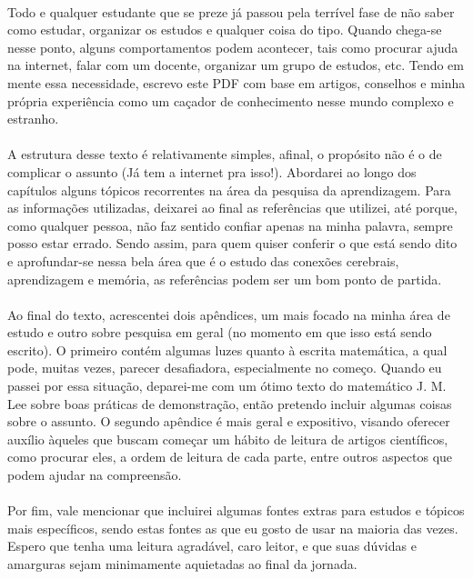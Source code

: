 \documentclass{article}
\begin{document}
\paragraph{} Todo e qualquer estudante que se preze já passou pela terrível fase de não saber como estudar,
organizar os estudos e qualquer coisa do tipo. Quando chega-se nesse ponto, alguns comportamentos podem acontecer, 
tais como procurar ajuda na internet, falar com um docente, organizar um grupo de estudos, etc. Tendo em mente 
essa necessidade, escrevo este PDF com base em artigos, conselhos e minha própria experiência como um caçador de conhecimento nesse
mundo complexo e estranho.

\paragraph{} A estrutura desse texto é relativamente simples, afinal, o propósito não é o de complicar o assunto (Já tem a internet pra isso!). Abordarei
ao longo dos capítulos alguns tópicos recorrentes na área da pesquisa da aprendizagem. Para as informações utilizadas, deixarei ao final as referências
que utilizei, até porque, como qualquer pessoa, não faz sentido confiar apenas na minha palavra, sempre posso estar errado. Sendo assim, para quem quiser 
conferir o que está sendo dito e aprofundar-se nessa bela área que é o estudo das conexões cerebrais, aprendizagem e memória, as referências podem ser 
um bom ponto de partida.

\paragraph{} Ao final do texto, acrescentei dois apêndices, um mais focado na minha área de estudo e outro sobre pesquisa em geral (no momento em que isso está sendo escrito). O primeiro contém algumas luzes quanto à escrita matemática,
a qual pode, muitas vezes, parecer desafiadora, especialmente no começo. Quando eu passei por essa situação, deparei-me com um ótimo texto do matemático J. M. Lee sobre
boas práticas de demonstração, então pretendo incluir algumas coisas sobre o assunto. 
O segundo apêndice é mais geral e expositivo, visando oferecer auxílio àqueles que buscam começar um hábito de leitura de artigos científicos, como procurar eles, a ordem de leitura de cada parte, entre outros 
aspectos que podem ajudar na compreensão. 

\paragraph{} Por fim, vale mencionar que incluirei algumas fontes extras para estudos e tópicos mais específicos, sendo estas fontes as que eu gosto de usar na maioria das vezes. Espero que tenha uma leitura agradável,
caro leitor, e que suas dúvidas e amarguras sejam minimamente aquietadas ao final da jornada.
\newpage
\end{document}
